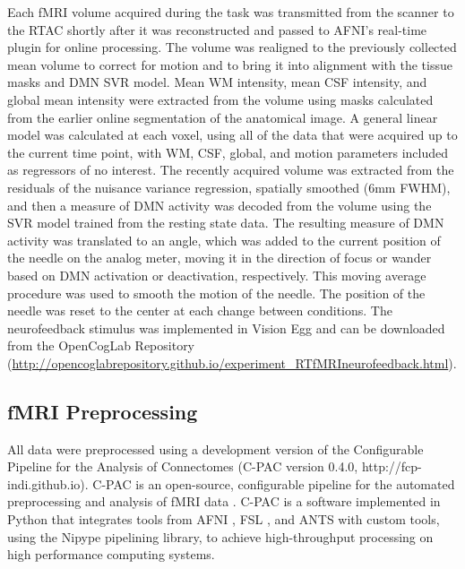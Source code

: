 Each fMRI volume acquired during the task was transmitted from the scanner to the RTAC shortly after it was reconstructed and passed to AFNI's real-time plugin \cite{Cox_1995} for online processing. The volume was realigned to the previously collected mean volume to correct for motion and to bring it into alignment with the tissue masks and DMN SVR model. Mean WM intensity, mean CSF intensity, and global mean intensity were extracted from the volume using masks calculated from the earlier online segmentation of the anatomical image. A general linear model was calculated at each voxel, using all of the data that were acquired up to the current time point, with WM, CSF, global, and motion parameters included as regressors of no interest. The recently acquired volume was extracted from the residuals of the nuisance variance regression, spatially smoothed (6mm FWHM), and then a measure of DMN activity was decoded from the volume using the SVR model trained from the resting state data. The resulting measure of DMN activity was translated to an angle, which was added to the current position of the needle on the analog meter, moving it in the direction of focus or wander based on DMN activation or deactivation, respectively. This moving average procedure was used to smooth the motion of the needle. The position of the needle was reset to the center at each change between conditions. The neurofeedback stimulus was implemented in Vision Egg \cite{Straw_2008} and can be downloaded from the OpenCogLab Repository (\href{http://opencoglabrepository.github.io/experiment_RTfMRIneurofeedback.html}{http://opencoglabrepository.github.io/experiment\_RTfMRIneurofeedback.html}).

\subsection{fMRI Preprocessing}

All data were preprocessed using a development version of the Configurable Pipeline for the Analysis of Connectomes (C-PAC version 0.4.0, http://fcp-indi.github.io). C-PAC is an open-source, configurable pipeline for the automated preprocessing and analysis of fMRI data \cite{Cameron_2013}. C-PAC is a software implemented in Python that integrates tools from AFNI \cite{Cox_1996}, FSL \cite{Smith2004}, and ANTS \cite{Avants_2008} with custom tools, using the Nipype \cite{Gorgolewski_2011} pipelining library, to achieve high-throughput processing on high performance computing systems.


